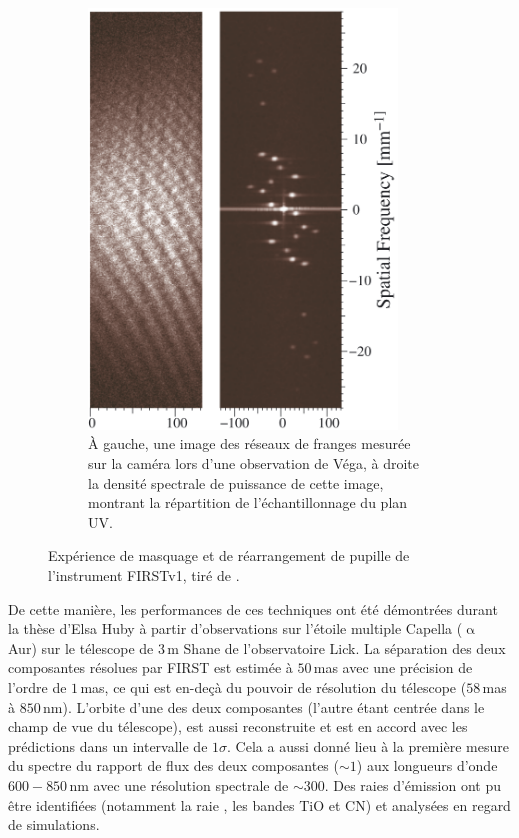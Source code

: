 \begin{figure}[ht!]
\begin{subfigure}[t]{0.45\textwidth}
        \includegraphics[width=0.9\textwidth]{Figure_Chap1/Huby2012_Figure3.png}
        \caption{À gauche, une image des réseaux de franges mesurée sur la caméra lors d'une observation de Véga, à droite la densité spectrale de puissance de cette image, montrant la répartition de l'échantillonnage du plan UV.}
        \label{fig:FIRSTv1PupilMaskingB}
    \end{subfigure}
    \caption[Expérience de masquage et de réarrangement de pupille de l'instrument FIRSTv1.]{Expérience de masquage et de réarrangement de pupille de l'instrument FIRSTv1, tiré de \cite{huby2012}.}
    \label{fig:FIRSTv1PupilMasking}
\end{figure}

De cette manière, les performances de ces techniques ont été démontrées durant la thèse d'Elsa Huby \citep{huby2013} à partir d'observations sur l'étoile multiple Capella ($\upalpha$ Aur) sur le télescope de $3 \,$m Shane de l'observatoire Lick. La séparation des deux composantes résolues par \ac{FIRST} est estimée à $50 \,$mas avec une précision de l'ordre de $1 \,$mas, ce qui est en-deçà du pouvoir de résolution du télescope ($58 \,$mas à $850 \,$nm). L'orbite d'une des deux composantes (l'autre étant centrée dans le champ de vue du télescope), est aussi reconstruite et est en accord avec les prédictions dans un intervalle de $1 \sigma$. Cela a aussi donné lieu à la première mesure du spectre du rapport de flux des deux composantes ($\sim 1$) aux longueurs d'onde $600 - 850 \,$nm avec une résolution spectrale de $\sim 300$. Des raies d'émission ont pu être identifiées (notamment la raie \ha, les bandes TiO et CN) et analysées en regard de simulations.

